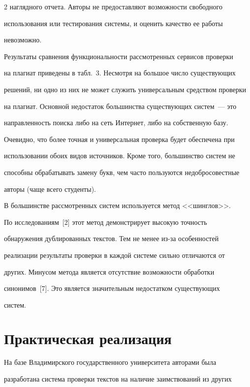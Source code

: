 \begin{multicols}{2}
наглядного отчета. Авторы не предоставляют возможности свободного 

использования или тестирования сис\-те\-мы, и оценить качество ее работы 

невозможно.

  

  Результаты сравнения функциональности рассмотренных сервисов проверки 

на плагиат приведены в табл.~3. Несмотря на большое число существующих 

решений, ни одно из них не может служить универсальным средством проверки 

на плагиат. Основной недостаток большинства существующих сис\-тем~--- это 

направленность поиска либо на сеть Интернет, либо на собственную базу. 

Очевидно, что более точная и универсальная проверка будет обеспечена при 

использовании обоих видов источников. Кроме того, большинство сис\-тем не 

способны обрабатывать замену букв, чем часто пользуются недобросовестные 

авторы (чаще всего студенты).







  В большинстве рассмотренных сис\-тем используется метод <<шинглов>>. 

По исследованиям~[2] этот метод демонстрирует высокую точность 

обнаружения дублированных текстов. Тем не менее из-за особенностей 

реализации результаты проверки в каждой сис\-те\-ме сильно отличаются от 

других. Минусом метода является отсутствие возможности обработки 

синонимов~[7]. Это является значительным недостатком существующих 

  сис\-тем. 



\section{Практическая реализация}

  

  На базе Владимирского государственного университета авторами была 

разработана сис\-те\-ма проверки текстов на наличие заимствований из других 


\end{multicols}
